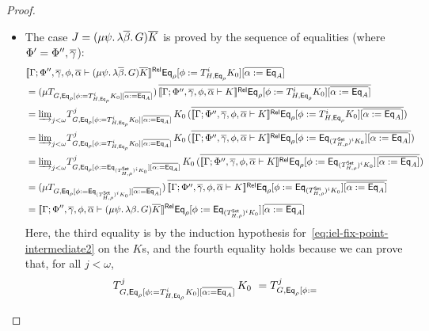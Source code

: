 \documentclass[acmsmall,review,anonymous]{acmart}
\theoremstyle{definition}
\begin{document}
\begin{proof}
\begin{itemize}
\begin{itemize}
\item 
The case $J = (\mu \psi.\, \lambda \overline{\beta}.\, G) \overline{K}$
is proved by the sequence of equalities (where $\Phi' = \Phi'', \overline{\gamma}$):
\[
\begin{split}
& \oCPORsem{\Gamma; \Phi'', \ol\gamma, \phi, \ol{\alpha} \vdash (\mu \psi.\, \lambda \ol{\beta}.\, G) \ol{K}}
  \Eq_{\rho} [\phi := T^i_{H,\Eq_{\rho}} K_0]
  [\overline{\alpha := \Eq_A}] \\
&= (\mu {T_{G, \Eq_{\rho}[\phi := T^i_{H,\Eq_{\rho}} K_0][\overline{\alpha := \Eq_A}]}})
  \,\ol{\oCPORsem{\Gamma; \Phi'', \ol\gamma, \phi, \ol{\alpha} \vdash K}\Eq_{\rho}
  [\phi := T^i_{H,\Eq_{\rho}} K_0][\overline{\alpha := \Eq_A}]} \\ 
&= \colim{j < \omega} {T^j_{G, \Eq_{\rho}[\phi := T^{i}_{H,\Eq_{\rho}} K_0][\overline{\alpha := \Eq_A}]}}\,K_0
  \,(\ol{\oCPORsem{\Gamma; \Phi'', \ol\gamma, \phi, \ol{\alpha} \vdash K}\Eq_{\rho}
  [\phi := T^{i}_{H,\Eq_{\rho}} K_0][\overline{\alpha := \Eq_A}]}) \\ 
&= \colim{j < \omega} {T^j_{G, \Eq_{\rho}[\phi := T^{i}_{H,\Eq_{\rho}} K_0][\overline{\alpha := \Eq_A}]}}\,K_0
  \,(\ol{\oCPORsem{\Gamma; \Phi'', \ol\gamma, \phi, \ol{\alpha} \vdash K}\Eq_{\rho}
  [\phi := \Eq_{(T^{\oCPO}_{H,\rho})^i K_0}][\overline{\alpha := \Eq_A}]}) \\  %
&= \colim{j < \omega} {T^j_{G, \Eq_{\rho}[\phi := \Eq_{(T^{\oCPO}_{H,\rho})^i K_0}][\overline{\alpha := \Eq_A}]}}\,K_0
  \,(\ol{\oCPORsem{\Gamma; \Phi'', \ol\gamma, \phi, \ol{\alpha} \vdash K}\Eq_{\rho}
  [\phi := \Eq_{(T^{\oCPO}_{H,\rho})^i K_0}][\overline{\alpha := \Eq_A}]}) \\ 
&= (\mu {T_{G, \Eq_{\rho}[\phi := \Eq_{(T^{\oCPO}_{H,\rho})^i K_0}][\overline{\alpha := \Eq_A}]}})
  \,\ol{\oCPORsem{\Gamma; \Phi'', \ol\gamma, \phi, \ol{\alpha} \vdash K}\Eq_{\rho}
  [\phi := \Eq_{(T^{\oCPO}_{H,\rho})^i K_0}][\overline{\alpha := \Eq_A}]} \\ 
&= \oCPORsem{\Gamma; \Phi'', \ol\gamma, \phi, \ol{\alpha} \vdash (\mu \psi.\, \lambda \beta.\, G) \ol{K}}
  \Eq_{\rho}[\phi := \Eq_{(T^{\oCPO}_{H,\rho})^i K_0}][\overline{\alpha := \Eq_{A}}]
\end{split}
\]
Here, the third equality is by the induction hypothesis
for~\eqref{eq:iel-fix-point-intermediate2} on the $K$s, and the fourth
equality holds because we can prove that, for all $j < \omega$,
\begin{equation}\label{eq:helper}
T^j_{G,
\mathsf{Eq}_{\rho}[\phi := T^i_{H,\mathsf{Eq}_{\rho}} K_0][\overline{\alpha :=
    \mathsf{Eq}_A}]}\,K_0 \ = T^j_{G, \mathsf{Eq}_{\rho}[\phi :=
}
\end{equation}
\end{itemize}
\end{itemize}
\end{proof}
\end{document}
